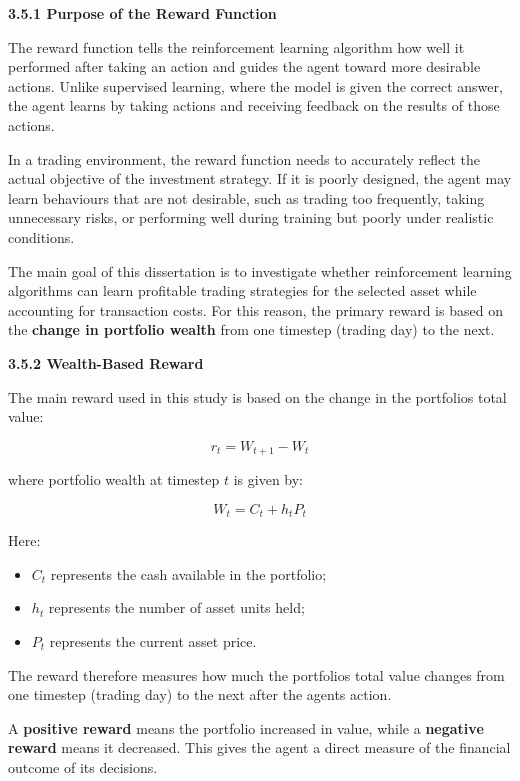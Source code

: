 \textbf{3.5.1 Purpose of the Reward Function}

The reward function tells the reinforcement learning algorithm how well
it performed after taking an action and guides the agent toward more
desirable actions. Unlike supervised learning, where the model is given
the correct answer, the agent learns by taking actions and receiving
feedback on the results of those actions.

In a trading environment, the reward function needs to accurately
reflect the actual objective of the investment strategy. If it is poorly
designed, the agent may learn behaviours that are not desirable, such as
trading too frequently, taking unnecessary risks, or performing well
during training but poorly under realistic conditions.

The main goal of this dissertation is to investigate whether
reinforcement learning algorithms can learn profitable trading
strategies for the selected asset while accounting for transaction
costs. For this reason, the primary reward is based on the
\textbf{change in portfolio wealth} from one timestep (trading day) to
the next.

\textbf{3.5.2 Wealth-Based Reward}

The main reward used in this study is based on the change in the
portfolio\textquotesingle s total value:

\[r_{t} = W_{t + 1} - W_{t}\]

where portfolio wealth at timestep \(t\) is given by:

\[W_{t} = C_{t} + h_{t}P_{t}\]

Here:

\begin{itemize}
\item
  \(C_{t}\) represents the cash available in the portfolio;
\item
  \(h_{t}\) represents the number of asset units held;
\item
  \(P_{t}\) represents the current asset price.
\end{itemize}

The reward therefore measures how much the portfolio\textquotesingle s
total value changes from one timestep (trading day) to the next after
the agent\textquotesingle s action.

A \textbf{positive reward} means the portfolio increased in value, while
a \textbf{negative reward} means it decreased. This gives the agent a
direct measure of the financial outcome of its decisions.

